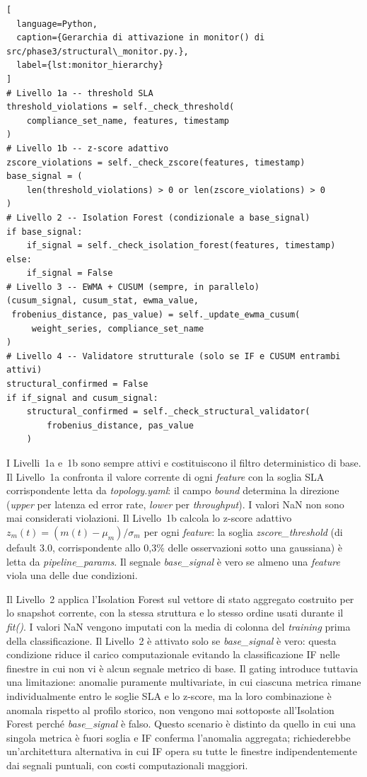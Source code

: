 \begin{lstlisting}[
  language=Python,
  caption={Gerarchia di attivazione in monitor() di src/phase3/structural\_monitor.py.},
  label={lst:monitor_hierarchy}
]
# Livello 1a -- threshold SLA
threshold_violations = self._check_threshold(
    compliance_set_name, features, timestamp
)
# Livello 1b -- z-score adattivo
zscore_violations = self._check_zscore(features, timestamp)
base_signal = (
    len(threshold_violations) > 0 or len(zscore_violations) > 0
)
# Livello 2 -- Isolation Forest (condizionale a base_signal)
if base_signal:
    if_signal = self._check_isolation_forest(features, timestamp)
else:
    if_signal = False
# Livello 3 -- EWMA + CUSUM (sempre, in parallelo)
(cusum_signal, cusum_stat, ewma_value,
 frobenius_distance, pas_value) = self._update_ewma_cusum(
     weight_series, compliance_set_name
)
# Livello 4 -- Validatore strutturale (solo se IF e CUSUM entrambi attivi)
structural_confirmed = False
if if_signal and cusum_signal:
    structural_confirmed = self._check_structural_validator(
        frobenius_distance, pas_value
    )
\end{lstlisting}

I Livelli~1a e~1b sono sempre attivi e costituiscono il filtro deterministico di base. Il
Livello~1a confronta il valore corrente di ogni \textit{feature} con la soglia \gls{SLA}
corrispondente letta da \textit{topology.yaml}: il campo \textit{bound} determina la direzione
(\textit{upper} per latenza ed error rate, \textit{lower} per \textit{throughput}). I valori NaN
non sono mai considerati violazioni. Il Livello~1b calcola lo z-score adattivo
$z_m(t) = (m(t) - \mu_m) / \sigma_m$ per ogni \textit{feature}: la soglia
\textit{zscore\_threshold} (di default 3.0, corrispondente allo 0,3\% delle osservazioni sotto
una gaussiana) è letta da \textit{pipeline\_params}. Il segnale \textit{base\_signal} è vero se
almeno una \textit{feature} viola una delle due condizioni.

Il Livello~2 applica l'Isolation Forest sul vettore di stato aggregato costruito per lo snapshot
corrente, con la stessa struttura e lo stesso ordine usati durante il \textit{fit()}. I valori
NaN vengono imputati con la media di colonna del \textit{training} prima della classificazione.
Il Livello~2 è attivato solo se \textit{base\_signal} è vero: questa condizione riduce il carico
computazionale evitando la classificazione IF nelle finestre in cui non vi è alcun segnale metrico
di base. Il gating introduce tuttavia una limitazione: anomalie puramente multivariate, in cui
ciascuna metrica rimane individualmente entro le soglie \gls{SLA} e lo z-score, ma la loro
combinazione è anomala rispetto al profilo storico, non vengono mai sottoposte all'Isolation
Forest perché \textit{base\_signal} è falso. Questo scenario è distinto da quello in cui una
singola metrica è fuori soglia e IF conferma l'anomalia aggregata; richiederebbe un'architettura
alternativa in cui IF opera su tutte le finestre indipendentemente dai segnali puntuali, con costi
computazionali maggiori.

